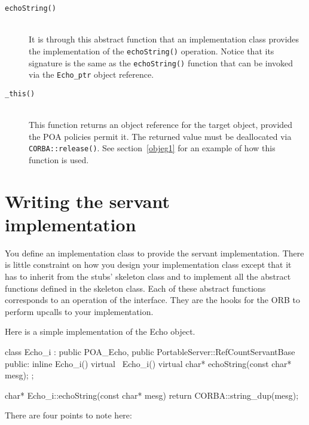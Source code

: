 \documentclass[11pt,twoside,a4paper]{book}
\newcommand{\type}[1]{\texttt{#1}}
\newcommand{\op}[1]{\texttt{#1()}}
\newcommand{\dsc}{\discretionary{}{}{}}
\begin{document}
\begin{description}

\item[\op{echoString}]\mbox{}\\
%
It is through this abstract function that an implementation class
provides the implementation of the \op{echoString} operation. Notice
that its signature is the same as the \op{echoString} function that
can be invoked via the \type{Echo\_ptr} object reference.

\item[\op{\_this}]\mbox{}\\
%
This function returns an object reference for the target object,
provided the POA policies permit it. The returned value must be
deallocated via \op{CORBA::\dsc{}release}.  See section~\ref{objeg1}
for an example of how this function is used.

\end{description}

\section{Writing the servant implementation}
\label{objimpl}

You define an implementation class to provide the servant
implementation. There is little constraint on how you design your
implementation class except that it has to inherit from the stubs'
skeleton class and to implement all the abstract functions defined in
the skeleton class. Each of these abstract functions corresponds to an
operation of the interface. They are the hooks for the ORB to perform
upcalls to your implementation.

Here is a simple implementation of the Echo object.

\begin{cxxlisting}
class Echo_i : public POA_Echo,
	       public PortableServer::RefCountServantBase
{
public:
  inline Echo_i() {}
  virtual ~Echo_i() {}
  virtual char* echoString(const char* mesg);
};

char* Echo_i::echoString(const char* mesg)
{
  return CORBA::string_dup(mesg);
}
\end{cxxlisting}

There are four points to note here:
\end{document}
